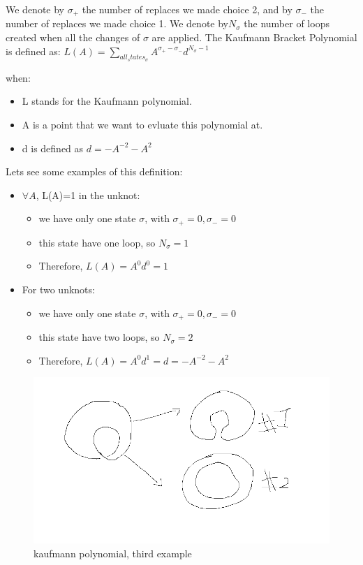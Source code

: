 \documentclass{article}
\begin{document}
We denote by \(\sigma_{+}\) the number of replaces we made choice 2, and by 
\(\sigma_{-}\) the number of replaces we made choice 1.
We denote by\(N_{\sigma}\) the number of loops created when all the changes of \(\sigma\) are applied.
The Kaufmann Bracket Polynomial is defined as:
\( L(A) = \sum\limits_{all_states_\sigma}{A^{\sigma_{+} -\sigma_{-}}d^{N_{\sigma} - 1}}\)

when:
\begin{itemize}
\item L stands for the Kaufmann polynomial.
\item A is a point that we want to evluate this polynomial at.
\item d is defined as \(d = -A^{-2} -A^2\) 
\end{itemize}

Lets see some examples of this definition:
\begin{itemize}
\item \(\forall A\), L(A)=1 in the unknot:
    \begin{itemize}
    \item we have only one state $\sigma$, with \(\sigma_{+}=0,\sigma_{-}=0\)
    \item this state have one loop, so \(N_{\sigma} = 1\)
    \item Therefore, $L(A) = A^{0}d^{0}=1$
    \end{itemize}
\item For two unknots:
    \begin{itemize}
    \item we have only one state $\sigma$, with \(\sigma_{+}=0,\sigma_{-}=0\)
    \item this state have two loops, so \(N_{\sigma} = 2\)
    \item Therefore, $L(A) = A^{0}d^{1}=d=-A^{-2}-A^{2}$
    \end{itemize}
\end{itemize}

\begin{figure}
\includegraphics[scale=0.17]{kauffman_calc}
\caption{kaufmann polynomial, third example}
\end{figure}
\end{document}
